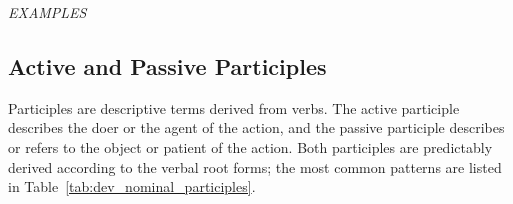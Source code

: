 \documentclass[grammar]{subfiles}
\begin{document}
	\begin{exe}
		\ex \emph{EXAMPLES}
	\end{exe}

	\subsection{Active and Passive Participles}
	\label{ssec:dev_active_passive_participles}

	Participles are descriptive terms derived from verbs. The active participle describes the doer or the agent of the action, and the passive participle describes or refers to the object or patient of the action. Both participles are predictably derived according to the verbal root forms; the most common patterns are listed in Table~\ref{tab:dev_nominal_participles}.
\end{document}
